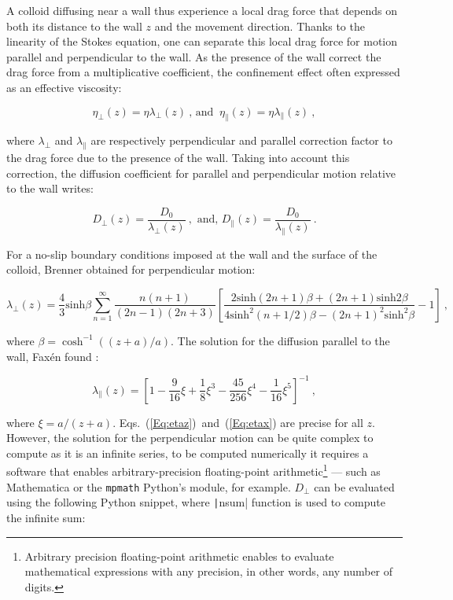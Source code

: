 A colloid diffusing near a wall thus experience a local drag force that depends on both its distance to the wall $z$ and the movement direction. Thanks to the linearity of the Stokes equation, one can separate this local drag force for motion parallel and perpendicular to the wall. As the presence of the wall correct the drag force from a multiplicative coefficient, the confinement effect often expressed as an effective viscosity:

\begin{equation}
	\eta _\bot (z) = {\eta}{\lambda _ \bot (z)}  ~ \text{, and } ~\eta _\parallel (z) =  {\eta}{\lambda _ \parallel (z)}~,
\end{equation}

where $\lambda _\bot$ and $\lambda _\parallel$ are respectively perpendicular and parallel correction factor to the drag force due to the presence of the wall. Taking into account this correction, the diffusion coefficient for parallel and perpendicular motion relative to the wall writes:

\begin{equation}
	D_\bot (z) =  \frac{D_0}{\lambda _\bot (z)}  ~, \text{ and, } D_\parallel (z) = \frac{D_0}{ \lambda_\parallel (z)} ~.
\end{equation}

For a no-slip boundary conditions imposed at the wall and the surface of the colloid, Brenner \cite{brenner_slow_1961} obtained for perpendicular motion:


\begin{equation}
	\lambda_ \bot (z) = \frac{4}{3}  \mathrm{sinh}\beta \sum _{n=1} ^{\infty} \frac{n(n+1)}{(2n-1)(2n+3)}
	\left[
	\frac
	{
		2\mathrm{sinh}(2n + 1)\beta + (2n +1)\mathrm{sinh}2\beta
	}
	{
		4\mathrm{sinh}^2(n + 1 /2)\beta  - (2n+1)^2 \mathrm{sinh}^2 \beta
	}
	-1
	\right] ~,
	\label{Eq:etaz}
\end{equation}

where $\beta = \cosh ^{-1} ((z+a)/a)$. The solution for the diffusion parallel to the wall, Faxén found \cite{faxen_fredholm_1924}:

\begin{equation}
	\lambda_\parallel(z) = 
	\left[
	1 - \frac{9}{16} \xi + \frac{1}{8}\xi^3 - \frac{45}{256}\xi^4 - \frac{1}{16}\xi^5
	\right]^{-1}~,
	\label{Eq:etax}
\end{equation}

where $\xi  = a / (z+a)$. Eqs.~(\ref{Eq:etaz})~and~(\ref{Eq:etax}) are precise for all $z$. However, the solution for the perpendicular motion can be quite complex to compute as it is an infinite series, to be computed numerically it requires a software that enables arbitrary-precision floating-point arithmetic\footnote{Arbitrary precision floating-point arithmetic enables to evaluate mathematical expressions with any precision, in other words, any number of digits.} --- such as Mathematica or the \texttt{mpmath} Python's module, for example. $D_\bot$ can be evaluated using the following Python snippet, where \texttt|nsum| function is used to compute the infinite sum:  


